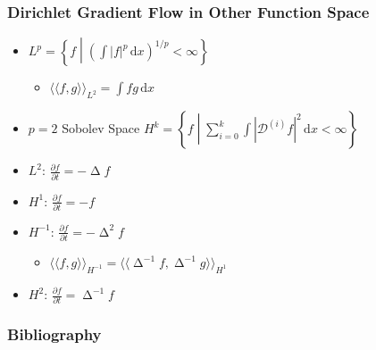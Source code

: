 \documentclass{beamer}
\theoremstyle{remark}
\newcommand{\intd}{\, \text{d}}
\newcommand{\inner}[1]{\langle \langle #1 \rangle \rangle}
\DeclareMathOperator{\laplace}{\Delta}
\begin{document}
\begin{frame}
    \frametitle{Dirichlet Gradient Flow in Other Function Space}
    \begin{definition}
        \begin{itemize}
            \item $L^p = \left\{ f \middle| \left( \int |f|^p \intd x \right)^{1/p} < \infty \right\}$
                \begin{itemize}
                    \item $\inner{f, g}_{L^2} = \int f g \intd x$
                \end{itemize}
            \item $p=2$ Sobolev Space $H^{k} = \left\{ f \middle| \sum_{i=0}^{k} \int \left| \mathcal{D}^{(i)} f \right|^2 \intd x < \infty \right\}$
        \end{itemize}
    \end{definition}

    \begin{itemize}
        \item $L^2$: $\frac{\partial f}{\partial t} = - \laplace f$
        \item $H^1$: $\frac{\partial f}{\partial t} = -f$
        \item $H^{-1}$: $\frac{\partial f}{\partial t} = - \laplace^2 f$
            \begin{itemize}
                \item $\inner{f, g}_{H^{-1}} = \inner{\laplace^{-1} f, \laplace^{-1} g}_{H^1}$
            \end{itemize}
        \item $H^2$: $\frac{\partial f}{\partial t} = \laplace^{-1} f$
    \end{itemize}
\end{frame}



\begin{frame}
    \frametitle{Bibliography}
    \printbibliography
\end{frame}
\end{document}
